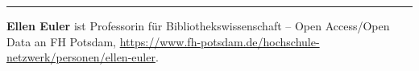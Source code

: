 \begin{center}\rule{0.5\linewidth}{0.5pt}\end{center}

\textbf{Ellen Euler} ist Professorin für Bibliothekswissenschaft -- Open
Access/Open Data an FH Potsdam,
\url{https://www.fh-potsdam.de/hochschule-netzwerk/personen/ellen-euler}.
